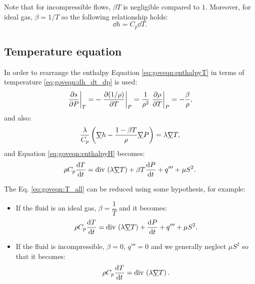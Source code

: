 \begin{remark}
Note that for incompressible flows, $\beta T$ is negligible compared to $1$. Moreover, for ideal gas, $\beta = 1/T$ so the following relationship holds:
\begin{equation}
 \dd h=C_p \dd T.
\end{equation}
%
\end{remark}

\subsection{Temperature equation}

In order to rearrange the enthalpy Equation \eqref{eq:goveqn:enthalpyT} in terms of temperature \eqref{eq:goveqn:dh_dt_dp} is used:
\begin{equation}
 \left.\dfrac{\partial s}{\partial P}\right|_T = -  \left.\dfrac{\partial (1/\rho)}{\partial T}\right|_P = \frac{1}{\rho^2} \left.\dfrac{\partial \rho}{\partial T}\right|_P=-\frac{\beta}{\rho},
\end{equation}
and also:
%
\begin{equation}
\dfrac{\lambda}{C_p} \left(\underline{\nabla} h -\dfrac{1-\beta T }{\rho}\underline{\nabla} P\right) = \lambda \underline{\nabla} T,
\end{equation}
%
 and Equation \eqref{eq:goveqn:enthalpyH} becomes:
\begin{equation}
  \rho C_p \dfrac{\mathrm{d} T}{\mathrm{d} t}=  \text{div}\, \left( \lambda \underline{\nabla} T \right) + \beta T \dfrac{\mathrm{d} P}{\mathrm{d} t} +q''' + \mu S^2.
\label{eq:goveqn:T_all}
\end{equation}

The Eq. \eqref{eq:goveqn:T_all} can be reduced using some hypothesis, for example:
\begin{itemize}
 \item If the fluid is an ideal gas, $\beta=\dfrac{1}{T}$ and it becomes:
\begin{equation}
  \rho C_p \dfrac{\mathrm{d} T}{\mathrm{d} t}=  \text{div}\, \left( \lambda \underline{\nabla} T \right) + \dfrac{\mathrm{d} P}{\mathrm{d} t} +q''' + \mu S^2.
\end{equation}

 \item If the fluid is incompressible, $\beta=0$, $q'''=0 $ and we generally neglect $\mu S^2$  so that it becomes:
\begin{equation}
  \rho C_p \dfrac{\mathrm{d} T}{\mathrm{d} t}=  \text{div}\, \left( \lambda \underline{\nabla} T \right).
\end{equation}
\end{itemize}

